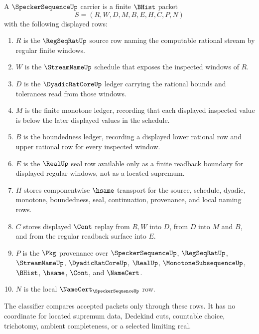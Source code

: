 \begin{definition}
\label{def:speckersequence-carrier}
A $\SpeckerSequenceUp$ carrier is a finite $\BHist$ packet
$$
S=(R,W,D,M,B,E,H,C,P,N)
$$
with the following displayed rows:
\begin{enumerate}
\item $R$ is the $\RegSeqRatUp$ source row naming the computable rational stream by regular finite windows.
\item $W$ is the $\StreamNameUp$ schedule that exposes the inspected windows of $R$.
\item $D$ is the $\DyadicRatCoreUp$ ledger carrying the rational bounds and tolerances read from those windows.
\item $M$ is the finite monotone ledger, recording that each displayed inspected value is below the later displayed values in the schedule.
\item $B$ is the boundedness ledger, recording a displayed lower rational row and upper rational row for every inspected window.
\item $E$ is the $\RealUp$ seal row available only as a finite readback boundary for displayed regular windows, not as a located supremum.
\item $H$ stores componentwise $\hsame$ transport for the source, schedule, dyadic, monotone, boundedness, seal, continuation, provenance, and local naming rows.
\item $C$ stores displayed $\Cont$ replay from $R,W$ into $D$, from $D$ into $M$ and $B$, and from the regular readback surface into $E$.
\item $P$ is the $\Pkg$ provenance over $\SpeckerSequenceUp$, $\RegSeqRatUp$, $\StreamNameUp$, $\DyadicRatCoreUp$, $\RealUp$, $\MonotoneSubsequenceUp$, $\BHist$, $\hsame$, $\Cont$, and $\NameCert$.
\item $N$ is the local $\NameCert_{\SpeckerSequenceUp}$ row.
\end{enumerate}
The classifier compares accepted packets only through these rows. It has no coordinate for located supremum data, Dedekind cuts, countable choice, trichotomy, ambient completeness, or a selected limiting real.
\end{definition}

